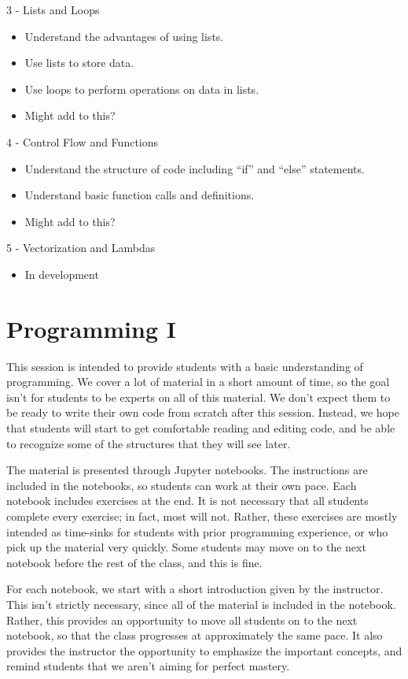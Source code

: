 \documentclass[11pt]{article}
\begin{document}
3 - Lists and Loops
\begin{itemize}
\item Understand the advantages of using lists.
\item Use lists to store data.
\item Use loops to perform operations on data in lists.
\item {\color{red} Might add to this?}
\end{itemize}

4 - Control Flow and Functions
\begin{itemize}
\item Understand the structure of code including ``if'' and ``else'' statements.
\item Understand basic function calls and definitions.
\item {\color{red} Might add to this?}
\end{itemize}

{\color{red} 5 - Vectorization and Lambdas
\begin{itemize}
\item In development
\end{itemize}}

\section*{Programming I}

This session is intended to provide students with a basic understanding of programming. We cover a lot of material in a short amount of time, so the goal isn't for students to be experts on all of this material. We don't expect them to be ready to write their own code from scratch after this session. Instead, we hope that students will start to get comfortable reading and editing code, and be able to recognize some of the structures that they will see later.

The material is presented through Jupyter notebooks. The instructions are included in the notebooks, so students can work at their own pace. Each notebook includes exercises at the end. It is not necessary that all students complete every exercise; in fact, most will not. Rather, these exercises are mostly intended as time-sinks for students with prior programming experience, or who pick up the material very quickly. Some students may move on to the next notebook before the rest of the class, and this is fine.

For each notebook, we start with a short introduction given by the instructor. This isn't strictly necessary, since all of the material is included in the notebook. Rather, this provides an opportunity to move all students on to the next notebook, so that the class progresses at approximately the same pace. It also provides the instructor the opportunity to emphasize the important concepts, and remind students that we aren't aiming for perfect mastery.
\end{document}
